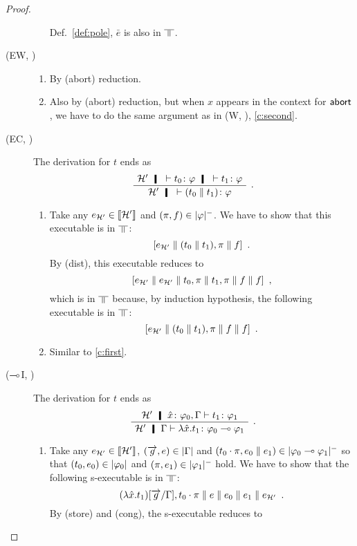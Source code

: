\begin{proof}
\begin{description}
\begin{enumerate}[label=\textit{(\arabic{*})}]
	      Def.~\ref{def:pole},
	      $\bar e$ is also in $\bbot$.
	\end{enumerate}
   \item[(EW, \textminus)]
	\begin{enumerate}[label=\textit{(\arabic{*})}]
	 \item  By (abort) reduction.
	 \item Also by (abort) reduction, but when $x$ appears in the
	       context for $\mathsf{abort\,}$, we have to do the same argument as
	       in (W, \textminus), \ref{c:second}.
	\end{enumerate}
   \item[(EC, \textminus)]
	The derivation for $t$ ends as
	\[
	 \aseq{\hyp'}{\tj{t_0}{\phi}\hmid \tr\tj{t_1}{\phi}}
	\useq{\hyp'}{\tj{(t_0\conc t_1)}{\phi}}
	\DisplayProof\enspace.
	\]
	\begin{enumerate}[label=\textit{(\arabic{*})}]
	 \item Take any $e_{\mathcal H'}\in \llbracket{\mathcal H'}\rrbracket$ and
	       $(\pi,f)\in|{\varphi}|^-$.
	       We have to show that this executable is in $\bbot$:
	       \[
	       [e_{\mathcal H'}\parallel (t_0\parallel t_1), \pi\parallel f]\enspace.
	       \]
	       By (dist), this executable reduces to
	       \[
	       [e_{\mathcal H'}\parallel e_{\mathcal H'}\parallel
	       t_0,\pi \parallel t_1, \pi\parallel f\parallel f]\enspace,
	       \]
	       which is in $\bbot$ because, by induction hypothesis, the
	       following executable is in $\bbot$:
	       \[
	       [e_{\mathcal H'}\parallel
	       (t_0\parallel t_1), \pi\parallel f\parallel f]\enspace.
	       \]
	 \item Similar to \ref{c:first}.
	\end{enumerate}
   \item[($\multimap$I, \textminus)]
	The derivation for $t$ ends as
	\[
	\aseq{\hyp'\tj{\hat x}{\phi_0},\G}{\tj{t_1}{\phi_1}}
	\useq{\hyp'\G}{\tj{\lambda{\hat{x}}.t_1}{\phi_0\limp\phi_1}}
	\DisplayProof\enspace.
	\]
	\begin{enumerate}[label=\textit{(\arabic{*})}]
	 \item Take any
	       $e_{\mathcal H'}\in \llbracket{\mathcal H'}\rrbracket$,
	       $(\overrightarrow g, e)\in|{\Gamma}|$
	       and
	       $(t_0\cdot\pi,e_0\parallel e_1)\in|{\varphi_0\multimap\varphi_1}|^-$
	       so that $(t_0,e_0)\in|{\varphi_0}|$ and
	       $(\pi,e_1)\in|{\varphi_1}|^-$ hold.
	       We have to show that the following s-executable is in
	       $\bbot$:
	       \[
	       (\lambda\hat x.t_1)[\overrightarrow g/\Gamma],
	       t_0\cdot\pi\parallel e\parallel e_0\parallel e_1\parallel e_{\mathcal
	       H'}\enspace.
	       \]
	       By (store) and (cong), the s-executable reduces to

\end{enumerate}
\end{description}
\end{proof}
